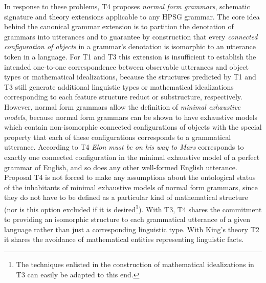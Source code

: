\documentclass[output=paper
                ,modfonts
                ,nonflat
	        ,collection
	        ,collectionchapter
	        ,collectiontoclongg
 	        ,biblatex
                ,babelshorthands
                ,newtxmath
                ,draftmode
                ,colorlinks, citecolor=brown
]{./langsci/langscibook}
\begin{document}
{{In response to these problems, T4 proposes \emph{normal form
  grammars}, schematic signature and theory extensions applicable to
any HPSG grammar. The core idea behind the canonical grammar extension
is to partition the denotation of grammars into utterances and to
guarantee by construction that every \emph{connected configuration of
  objects} in a grammar's denotation is isomorphic to an utterance
token in a language. For T1 and T3 this extension is insufficient to
establish the intended one-to-one correspondence between observable
utterances and object types or mathematical idealizations, because the
structures predicted by T1 and T3 still generate additional linguistic
types or mathematical idealizations corresponding to each feature
structure reduct or substructure, respectively. However, normal form
grammars allow the definition of \emph{minimal exhaustive models},
because normal form grammars can be shown to have exhaustive models
which contain non-isomorphic connected configurations of objects with
the special property that each of these configurations corresponds to
a grammatical utterance. According to T4 \emph{Elon must be on his way
  to Mars} corresponds to exactly one connected configuration in the
minimal exhaustive model of a perfect grammar of English, and so does
any other well-formed English utterance. Proposal T4
is not forced to make any assumptions about the ontological status of
the inhabitants of minimal exhaustive models of normal form grammars,
since they do not have to be defined as a particular kind of
mathematical structure (nor is this option excluded if it is
desired\footnote{The techniques enlisted in the construction of
mathematical idealizations in T3 can easily be adapted to this end.}). With T3, T4 shares the commitment to providing an isomorphic
structure to each grammatical utterance of a given language rather
than just a corresponding linguistic type. With King's theory T2 it
shares the avoidance of mathematical entities representing linguistic
facts.

}}
\end{document}

